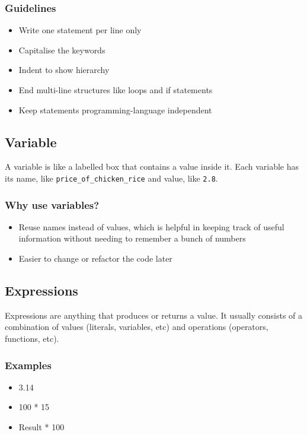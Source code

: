 \documentclass[11pt]{article}
\begin{document}
\subsubsection{Guidelines}
\label{sec:org7caa3ec}
\begin{itemize}
\item Write one statement per line only
\item Capitalise the keywords
\item Indent to show hierarchy
\item End multi-line structures like loops and if statements
\item Keep statements programming-language independent
\end{itemize}

\subsection{Variable}
\label{sec:org833b71e}
A variable is like a labelled box that contains a value inside it. Each variable has its name, like \texttt{price\_of\_chicken\_rice} and value, like \texttt{2.8}.

\subsubsection{Why use variables?}
\label{sec:orgbc7b383}
\begin{itemize}
\item Reuse names instead of values, which is helpful in keeping track of useful information without needing to remember a bunch of numbers
\item Easier to change or refactor the code later
\end{itemize}

\subsection{Expressions}
\label{sec:org216e1ed}
Expressions are anything that produces or returns a value. It usually consists of a combination of values (literals, variables, etc) and operations (operators, functions, etc).

\subsubsection{Examples}
\label{sec:org1c986d2}
\begin{itemize}
\item 3.14
\item 100 * 15
\item Result * 100
\end{itemize}
\end{document}
